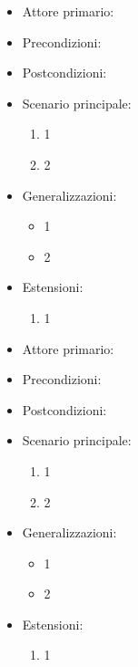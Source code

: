 \begin{itemize}
    \item Attore primario:
    \item Precondizioni:
    \item Postcondizioni:
    \item Scenario principale: \begin{enumerate}
        \item 1
        \item 2
    \end{enumerate}
    \item Generalizzazioni: \begin{itemize}
        \item 1
        \item 2
    \end{itemize}
    \item Estensioni: \begin{enumerate}
        \item 1
    \end{enumerate}
\end{itemize}



\begin{itemize}
    \item Attore primario:
    \item Precondizioni:
    \item Postcondizioni:
    \item Scenario principale: \begin{enumerate}
        \item 1
        \item 2
    \end{enumerate}
    \item Generalizzazioni: \begin{itemize}
        \item 1
        \item 2
    \end{itemize}
    \item Estensioni: \begin{enumerate}
        \item 1
    \end{enumerate}
\end{itemize}



